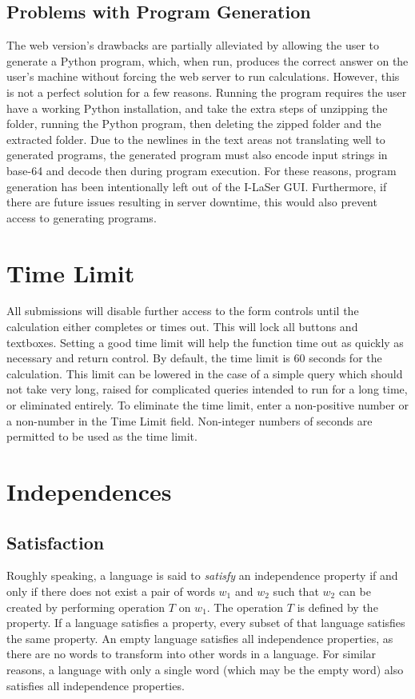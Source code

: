 \documentclass{article}
\begin{document}
\subsection{Problems with Program Generation}
\par The web version's drawbacks are partially alleviated by allowing the user to generate a Python program, which, when run, produces the correct answer on the user's machine without forcing the web server to run calculations. However, this is not a perfect solution for a few reasons. Running the program requires the user have a working Python installation, and take the extra steps of unzipping the folder, running the Python program, then deleting the zipped folder and the extracted folder. Due to the newlines in the text areas not translating well to generated programs, the generated program must also encode input strings in base-64 and decode then during program execution. For these reasons, program generation has been intentionally left out of the I-LaSer GUI. Furthermore, if there are future issues resulting in server downtime, this would also prevent access to generating programs.

\section{Time Limit}
All submissions will disable further access to the form controls until the calculation either completes or times out. This will lock all buttons and textboxes. 
Setting a good time limit will help the function time out as quickly as necessary and return control. 
By default, the time limit is 60 seconds for the calculation. This limit can be lowered in the case of a simple query which should not take very long, raised for complicated queries intended to run for a long time, or eliminated entirely.
To eliminate the time limit, enter a non-positive number or a non-number in the Time Limit field.
Non-integer numbers of seconds are permitted to be used as the time limit.

\section{Independences}

\subsection{Satisfaction}
\par Roughly speaking, a language is said to \textit{satisfy} an independence property if and only if there does not exist a pair of words $w_1$ and $w_2$ such that $w_2$ can be created by performing operation $T$ on $w_1$. The operation $T$ is defined by the property. If a language satisfies a property, every subset of that language satisfies the same property. An empty language satisfies all independence properties, as there are no words to transform into other words in a language. For similar reasons, a language with only a single word (which may be the empty word) also satisfies all independence properties. %
\end{document}
